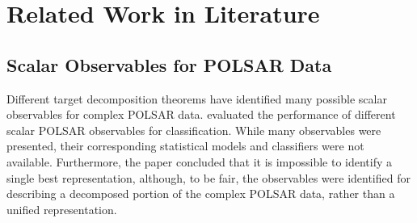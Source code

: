 \documentclass[printer]{tRSL2e}
\begin{document}
  
\section{Related Work in Literature}
\label{sec:lit_review}

  
\subsection{Scalar Observables for POLSAR Data} %
\label{sec:lit_models}

Different target decomposition theorems have identified many possible scalar observables for complex POLSAR data.
\citet{Alberga_2008_IJRS_4129} evaluated the performance of different scalar POLSAR observables for classification.
While many observables were presented, their corresponding statistical models and classifiers were not available.
Furthermore, the paper concluded that it is impossible to identify a single best representation,
  although, to be fair, the observables were identified for describing a decomposed portion of the complex POLSAR data,
  rather than a unified representation.
\end{document}
